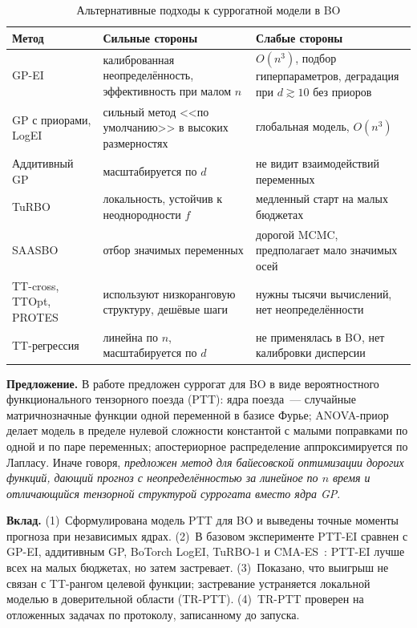 \documentclass[11pt,a4paper]{article}
\begin{document}
\begin{table}[t]
\centering\small
\caption{Альтернативные подходы к суррогатной модели в BO}\label{tab:lit}
\begin{tabularx}{\linewidth}{>{\raggedright\arraybackslash}p{3.6cm}>{\raggedright\arraybackslash}X>{\raggedright\arraybackslash}X}
\toprule
Метод & Сильные стороны & Слабые стороны \\
\midrule
GP-EI \cite{jones1998ego,snoek2012practical} & калиброванная неопределённость, эффективность при малом $n$ & $O(n^3)$, подбор гиперпараметров, деградация при $d\gtrsim10$ без приоров \\
GP с приорами, LogEI \cite{hvarfner2024vanilla,ament2023logei,balandat2020botorch} & сильный метод <<по умолчанию>> в высоких размерностях & глобальная модель, $O(n^3)$ \\
Аддитивный GP \cite{duvenaud2011additive,kandasamy2015additive} & масштабируется по $d$ & не видит взаимодействий переменных \\
TuRBO \cite{eriksson2019turbo} & локальность, устойчив к неоднородности $f$ & медленный старт на малых бюджетах \\
SAASBO \cite{eriksson2021saasbo} & отбор значимых переменных & дорогой MCMC, предполагает мало значимых осей \\
TT-cross, TTOpt, PROTES \cite{oseledets2010ttcross,sozykin2022ttopt,batsheva2023protes} & используют низкоранговую структуру, дешёвые шаги & нужны тысячи вычислений, нет неопределённости \\
TT-регрессия \cite{wesel2021fourier,izmailov2018ttgp,novikov2016expmachines} & линейна по $n$, масштабируется по $d$ & не применялась в BO, нет калибровки дисперсии \\
\bottomrule
\end{tabularx}
\end{table}

\textbf{Предложение.} В работе предложен суррогат для BO в виде вероятностного функционального тензорного
поезда (PTT): ядра поезда~--- случайные матричнозначные функции одной переменной в базисе Фурье; ANOVA-приор
делает модель в пределе нулевой сложности константой с малыми поправками по одной и по паре переменных;
апостериорное распределение аппроксимируется по Лапласу. Иначе говоря, \emph{предложен метод для
байесовской оптимизации дорогих функций, дающий прогноз с неопределённостью за линейное по $n$ время
и отличающийся тензорной структурой суррогата вместо ядра GP}.

\textbf{Вклад.} (1)~Сформулирована модель PTT для BO и выведены точные моменты прогноза при независимых
ядрах. (2)~В базовом эксперименте PTT-EI сравнен с GP-EI, аддитивным GP, BoTorch LogEI, TuRBO-1 и
CMA-ES~\cite{hansen2016cma}: PTT-EI лучше всех на малых бюджетах, но затем застревает. (3)~Показано, что
выигрыш не связан с TT-рангом целевой функции; застревание устраняется локальной моделью в доверительной
области (TR-PTT). (4)~TR-PTT проверен на отложенных задачах по протоколу, записанному до запуска.
\end{document}
